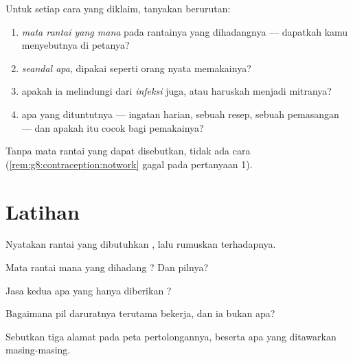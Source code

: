 \begin{method}\label{met:g8:contraception:evaluate}
Untuk setiap cara yang diklaim, tanyakan berurutan:
\begin{enumerate}
  \item \emph{mata rantai yang mana} pada rantainya yang
        dihadangnya --- dapatkah kamu menyebutnya di petanya?
  \item \emph{seandal apa}, dipakai seperti orang nyata memakainya?
  \item apakah ia melindungi dari \emph{infeksi} juga, atau
        haruskah  menjadi mitranya?
  \item apa yang dituntutnya --- ingatan harian, sebuah
        resep, sebuah pemasangan --- dan apakah itu cocok
        bagi pemakainya?
\end{enumerate}
Tanpa mata rantai yang dapat disebutkan, tidak ada cara
(\cref{rem:g8:contraception:notwork} gagal pada pertanyaan
1).
\end{method}

\section{Latihan}

\begin{exercise}[$\star$]\label{exo:g8:contraception:1}
Nyatakan rantai yang dibutuhkan , lalu rumuskan
 terhadapnya.
\end{exercise}

\begin{exercise}[$\star$]\label{exo:g8:contraception:2}
Mata rantai mana yang dihadang ? Dan pilnya?
\end{exercise}

\begin{exercise}[$\star$]\label{exo:g8:contraception:3}
Jasa kedua apa yang hanya diberikan ?
\end{exercise}

\begin{exercise}[$\star$]\label{exo:g8:contraception:4}
Bagaimana pil daruratnya terutama bekerja, dan ia bukan
apa?
\end{exercise}

\begin{exercise}[$\star$]\label{exo:g8:contraception:5}
Sebutkan tiga alamat pada peta pertolongannya, beserta apa
yang ditawarkan masing-masing.
\end{exercise}

